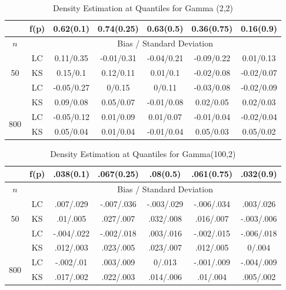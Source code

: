 \documentclass[12pt]{article}
\numberwithin{equation}{section}
\begin{document}
	
	
\begin{table}[H]
\begin{center}	

\caption{Density Estimation at Quantiles for Gamma (2,2) }
	
\begin{tabular} {| c | c | c | c | c | c | c | } 

	 \hline
		&f(p)&	0.62(0.1)&	0.74(0.25)&	0.63(0.5)&	0.36(0.75)&	0.16(0.9)\\ 
 \hline 
 	$n$ & & \multicolumn{5}{|c|}{Bias / Standard Deviation} 
 \\ 
 \hline 
\multirow{3}{*}{50}		&	LC	&0.11/0.35	&-0.01/0.31	&-0.04/0.21	&-0.09/0.22	&0.01/0.13\\ 
			&	KS	&0.15/0.1	&0.12/0.11	&0.01/0.1	&-0.02/0.08	&-0.02/0.07\\ 
	\hline 
\multirow{3}{*}{200}		&	LC	&-0.05/0.27	&0/0.15	&0/0.11	&-0.03/0.08	&-0.02/0.09\\ 
			&	KS	&0.09/0.08	&0.05/0.07	&-0.01/0.08	&0.02/0.05	&0.02/0.03\\ 
	\hline 
\multirow{3}{*}{800}		&	LC	&-0.05/0.12	&0.01/0.09	&0.01/0.07	&-0.01/0.04	&-0.02/0.04\\ 
			&	KS	&0.05/0.04	&0.01/0.04	&-0.01/0.04	&0.05/0.03	&0.05/0.02\\ 
	\hline 

\end{tabular}
\end{center}	
	
\end{table}	
	
	
\begin{table}[H]

\begin{center}	

\caption{Density Estimation at Quantiles for Gamma(100,2)}

\begin{tabular} {| c | c | c | c | c | c | c | } 

	 \hline
		&f(p)&	.038(0.1)&	.067(0.25)&	.08(0.5)&	.061(0.75)&	.032(0.9)\\ 
 \hline 
 	$n$ & & \multicolumn{5}{|c|}{Bias / Standard Deviation} 
 \\ 
 \hline 
\multirow{3}{*}{50}		&	LC	&.007/.029	&-.007/.036	&-.003/.029	&-.006/.034	&.003/.026\\ 
			&	KS	&.01/.005	&.027/.007	&.032/.008	&.016/.007	&-.003/.006\\ 
	\hline 
\multirow{3}{*}{200}		&	LC	&-.004/.022	&-.002/.018	&.003/.016	&-.002/.015	&-.006/.018\\ 
			&	KS	&.012/.003	&.023/.005	&.023/.007	&.012/.005	&0/.004\\ 
	\hline 
\multirow{3}{*}{800}		&	LC	&-.002/.01	&.003/.009	&0/.013	&-.001/.009	&-.004/.009\\ 
			&	KS	&.017/.002	&.022/.003	&.014/.006	&.01/.004	&.005/.002\\ 
	\hline 

\end{tabular}
\end{center}
\end{table}
	
\end{document}
